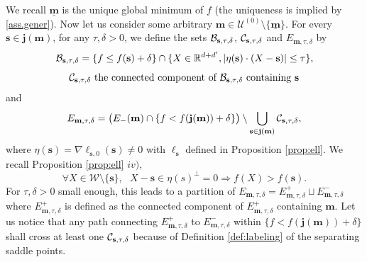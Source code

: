 \documentclass[12pt]{amsart}
\newcommand{\R}{\mathbb R}
\numberwithin{equation}{section}
\numberwithin{figure}{section}
\def\m{\mathbf{m}}
\def\s{\mathbf{s}}
\def\j{\mathbf{j}}
\def\um{\underline{\m}}
\def\uuu{{\mathcal U}}\def\vvv{{\mathcal V}}\def\www{{\mathcal W}}\def\xxx{{\mathcal X}}
\begin{document}
We recall $\um$ is the unique global minimum of $f$ (the uniqueness is implied by \eqref{ass.gener}). Now let us consider some arbitrary $\m\in\uuu^{(0)}\setminus\{\um\}$. For every $\s\in\j(\m)$, for any $\tau,\delta>0$, we define the sets $\bbb_{\s,\tau,\delta}$, $\ccc_{\s,\tau,\delta}$ and $E_{\m,\tau,\delta}$ by
\begin{equation*}
\bbb_{\s,\tau,\delta} = \{f\leq f(\s)+\delta\}\cap\{X\in\R^{d+d'},|\eta(\s)\cdot(X - \s)|\leq\tau\},
\end{equation*}
\begin{equation}\label{eq:ccc}
\ccc_{\s,\tau,\delta} \mbox{ the connected component of } \bbb_{\s,\tau,\delta} \mbox{ containing } \s
\end{equation}
and
\begin{equation*}
E_{\m,\tau,\delta} = \big(E_-(\m)\cap\{f<f(\j(\m))+\delta\}\big)\setminus\bigcup_{\s\in\j(\m)}\ccc_{\s,\tau,\delta},
\end{equation*}
where $\eta(\s) = \nabla\ell_{\s,0}(\s)\neq0$ with $\ell_{\s}$ defined in Proposition \ref{prop:ell}. We recall Proposition \ref{prop:ell} $iv)$,
\begin{equation*}
\forall X\in\www\setminus\{\s\},\ \ \ X-\s\in\eta(s)^\bot = 0 \Rightarrow f(X) > f(\s).
\end{equation*}
For $\tau,\delta>0$ small enough, this leads to a partition of $E_{\m,\tau,\delta} = E^+_{\m,\tau,\delta}\sqcup E^-_{\m,\tau,\delta}$ where $E^+_{\m,\tau,\delta}$ is defined as the connected component of $E^+_{\m,\tau,\delta}$ containing $\m$. Let us notice that any path connecting $E^+_{\m,\tau,\delta}$ to $E^-_{\m,\tau,\delta}$ within $\{f<f(\j(\m))+\delta\}$ shall cross at least one $\ccc_{\s,\tau,\delta}$ because of Definition \ref{def:labeling} of the separating saddle points.
\end{document}
